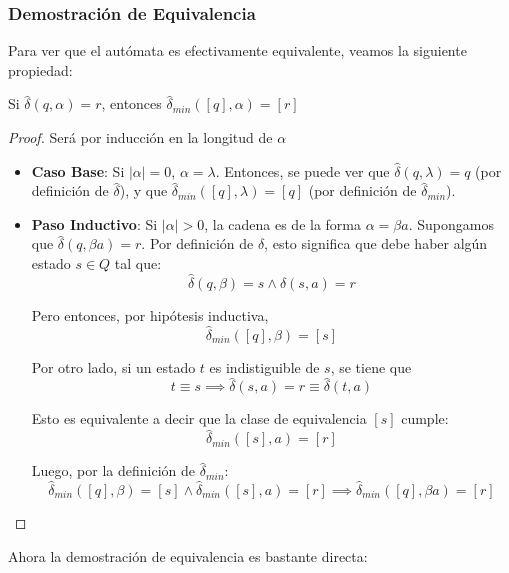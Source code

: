 \subsubsection{Demostración de Equivalencia}

Para ver que el autómata es efectivamente equivalente, veamos la siguiente propiedad:

\begin{lemma*}
    Si $\hat \delta(q, \alpha) = r$, entonces $\hat\delta_{min}([q], \alpha) = [r]$
\end{lemma*}
\begin{proof}
    Será por inducción en la longitud de $\alpha$
    \begin{itemize}
        \item \textbf{Caso Base}: Si $|\alpha| = 0$, $\alpha = \lambda$. Entonces, se puede ver que $\hat \delta(q, \lambda) = q$ (por definición de $\hat \delta$), y que $\hat\delta_{min}([q], \lambda) = [q]$ (por definición de $\hat\delta_{min}$).
        \item \textbf{Paso Inductivo}: Si $|\alpha| > 0$, la cadena es de la forma $\alpha = \beta a$. Supongamos que $\hat \delta(q, \beta a) = r$. Por definición de $\hat \delta$, esto significa que debe haber algún estado $s \in Q$ tal que:
              $$\hat \delta(q, \beta) = s \land \delta(s, a) = r$$

              Pero entonces, por hipótesis inductiva,
              $$\hat\delta_{min}([q], \beta) = [s]$$

              Por otro lado, si un estado $t$ es indistiguible de $s$, se tiene que
              $$t \equiv s \implies \hat\delta(s, a) = r \equiv \hat\delta(t, a)$$

              Esto es equivalente a decir que la clase de equivalencia $[s]$ cumple:
              $$
                  \hat\delta_{min}([s], a) = [r]
              $$

              Luego, por la definición de $\hat\delta_{min}$:
              $$
                  \hat\delta_{min}([q], \beta) = [s] \land \hat\delta_{min}([s], a) = [r] \implies \hat\delta_{min}([q], \beta a) = [r]
              $$
    \end{itemize}
\end{proof}

Ahora la demostración de equivalencia es bastante directa:

